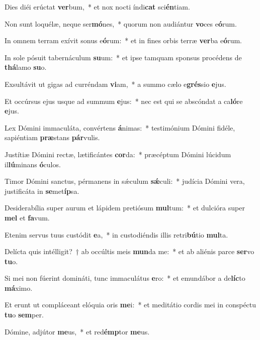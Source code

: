 \item Dies diéi erúctat \textbf{ver}bum,~* et nox nocti índi\textbf{cat} sci\textbf{én}tiam.
\item Non sunt loquélæ, neque ser\textbf{mó}nes,~* quorum non audiántur \textbf{vo}ces e\textbf{ó}rum.
\item In omnem terram exívit sonus e\textbf{ó}rum:~* et in fines orbis terræ \textbf{ver}ba e\textbf{ó}rum.
\item In sole pósuit tabernáculum \textbf{su}um:~* et ipse tamquam sponsus procédens de \textbf{thá}lamo \textbf{su}o.
\item Exsultávit ut gigas ad curréndam \textbf{vi}am,~* a summo cælo e\textbf{grés}sio \textbf{e}jus.
\item Et occúrsus ejus usque ad summum \textbf{e}jus:~* nec est qui se abscóndat a ca\textbf{ló}re \textbf{e}jus.
\item Lex Dómini immaculáta, convértens \textbf{á}nimas:~* testimónium Dómini fidéle, sapiéntiam \textbf{præ}stans \textbf{pár}vulis.
\item Justítiæ Dómini rectæ, lætificántes \textbf{cor}da:~* præcéptum Dómini lúcidum il\textbf{lú}minans \textbf{ó}culos.
\item Timor Dómini sanctus, pérmanens in sǽculum \textbf{sǽ}culi:~* judícia Dómini vera, justificáta in \textbf{se}met\textbf{íp}sa.
\item Desiderabília super aurum et lápidem pretiósum \textbf{mul}tum:~* et dulcióra super \textbf{mel} et \textbf{fa}vum.
\item Etenim servus tuus custódit \textbf{e}a,~* in custodiéndis illis retri\textbf{bú}tio \textbf{mul}ta.
\item Delícta quis intélligit?~† ab occúltis meis \textbf{mun}da me:~* et ab aliénis parce \textbf{ser}vo \textbf{tu}o.
\item Si mei non fúerint domináti, tunc immaculátus \textbf{e}ro:~* et emundábor a de\textbf{líc}to \textbf{má}ximo.
\item Et erunt ut compláceant elóquia oris \textbf{me}i:~* et meditátio cordis mei in conspéctu \textbf{tu}o \textbf{sem}per.
\item Dómine, adjútor \textbf{me}us,~* et red\textbf{émp}tor \textbf{me}us.
